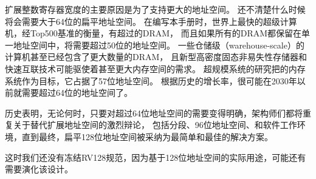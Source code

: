 \begin{commentary}
扩展整数寄存器宽度的主要原因是为了支持更大的地址空间。
还不清楚什么时候将会需要大于64位的扁平地址空间。
在编写本手册时，世界上最快的超级计算机，经Top500基准的衡量，有超过的DRAM，
而且如果所有的DRAM都保留在单一地址空间中，将需要超过50位的地址空间。
一些仓储级（warehouse-scale）的计算机甚至已经包含了更大数量的DRAM，
且新型高密度固态非易失性存储器和快速互联技术可能驱使着甚至更大内存空间的需求。
超规模系统的研究把的内存系统作为目标，它占据了57位地址空间。
根据历史的增长率，很可能在2030年以前就需要超过64位的地址空间了。

历史表明，无论何时，只要对超过64位地址空间的需要变得明确，架构师们都将重复关于替代扩展地址空间的激烈辩论，
包括分段、96位地址空间、和软件工作环境，直到最终，扁平128位地址空间被采纳为最简单和最佳的解决方案。

这时我们还没有冻结RV128规范，因为基于128位地址空间的实际用途，可能还有需要演化该设计。
\end{commentary}

